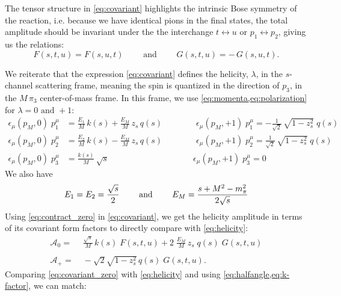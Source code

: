  The  tensor structure in \cref{eq:covariant} highlights the intrinsic Bose symmetry of the reaction, i.e. because we have identical pions in the final states, the total amplitude should be invariant under the the interchange \(t \leftrightarrow u \) or \(p_1 \leftrightarrow p_2\), giving us the relations:
   \begin{equation}
     F(s,t,u) = F(s,u,t) \qquad \text{ and } \qquad G(s,t,u) = - \, G(s,u,t).
   \end{equation}

 We reiterate that the expression \cref{eq:covariant} defines the helicity, \(\lambda\), in the \(s\)-channel scattering frame, meaning the spin is quantized in the direction of \(p_3\), in the \(M \, \pi_3\) center-of-mass frame.
 In this frame, we use \cref{eq:momenta,eq:polarization} for \(\lambda = 0 \text{ and } +1 \):
   \begin{align}
     \label{eq:contract_zero}
     \epsilon_\mu(p_M,0) \; p_1^\mu &= \frac{E_1}{M} \, k(s) + \frac{E_M}{M} \,  z_s \, q(s)
     \qquad \qquad \epsilon_\mu(p_M,+1) \; p_1^\mu = - \frac{1}{\sqrt{2}} \, \sqrt{1 - z_s^2} \; q(s) \nonumber \\
     \epsilon_\mu(p_M,0) \; p_2^\mu &= \frac{E_2}{M} \, k(s) - \frac{E_M}{M} \,  z_s \, q(s)
     \qquad \qquad
      \epsilon_\mu(p_M,+1) \; p_2^\mu =  \frac{1}{\sqrt{2}} \, \sqrt{1 - z_s^2} \; q(s)  \\
     \epsilon_\mu(p_M,0) \; p_3^\mu &= \frac{k(s)}{M} \, \sqrt{s}
      \qquad \qquad \qquad \qquad \qquad
      \epsilon_\mu(p_M,+1) \; p_3^\mu = 0 \nonumber
   \end{align}
 We also have
   \begin{equation}
     \label{eq:energies}
     E_1 = E_2 = \frac{\sqrt{s}}{2} \qquad \text{ and } \qquad E_M = \frac{s + M^2 - m_\pi^2}{2 \sqrt{s}}
   \end{equation}
 Using \cref{eq:contract_zero} in \cref{eq:covariant}, we get the helicity amplitude in terms of its covariant form factors to directly compare with \cref{eq:helicity}:
  \begin{align}
   \label{eq:covariant_zero}
    \mathcal{A}_0 =& \; \frac{\sqrt{s}}{M} \, k(s) \; F(s,t,u) + 2 \; \frac{E_M}{M} \, z_s \; q(s) \; G(s,t,u) \\
    \nonumber \\
    \label{eq:covariant_plus}
    \mathcal{A}_+ =& \; - \sqrt{2} \sqrt{1-z_s^2} \, q(s) \; G(s,t,u).
  \end{align}
 Comparing \cref{eq:covariant_zero} with \cref{eq:helicity} and using \cref{eq:halfangle,eq:k-factor}, we can match:
